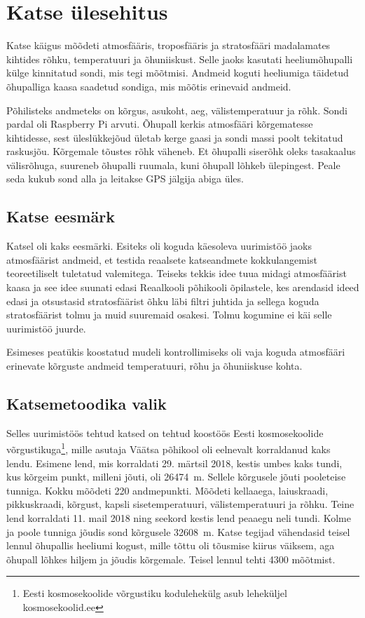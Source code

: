 \documentclass{trkut}%
\begin{document}
\chapter{Katse ülesehitus}
Katse käigus mõõdeti atmosfääris, troposfääris ja stratosfääri madalamates kihtides rõhku, temperatuuri ja õhuniiskust. Selle jaoks kasutati heeliumõhupalli külge kinnitatud sondi, mis tegi mõõtmisi. Andmeid koguti heeliumiga täidetud õhupalliga kaasa saadetud sondiga, mis mõõtis erinevaid andmeid.

Põhilisteks andmeteks on kõrgus, asukoht, aeg, välistemperatuur ja rõhk. Sondi pardal oli Raspberry Pi arvuti. Õhupall kerkis atmosfääri kõrgematesse kihtidesse, sest üleslükkejõud ületab kerge gaasi ja sondi massi poolt tekitatud raskusjõu. Kõrgemale tõustes rõhk väheneb. Et õhupalli siserõhk oleks tasakaalus välisrõhuga, suureneb õhupalli ruumala, kuni õhupall lõhkeb ülepingest. Peale seda kukub sond alla ja leitakse GPS jälgija abiga üles.


\section{Katse eesmärk}
Katsel oli kaks eesmärki. Esiteks oli koguda käesoleva uurimistöö jaoks atmosfäärist andmeid, et testida reaalsete katseandmete kokkulangemist teoreetiliselt tuletatud valemitega. Teiseks tekkis idee tuua midagi atmosfäärist kaasa ja see idee suunati edasi Reaalkooli põhikooli õpilastele, kes arendasid ideed edasi ja otsustasid stratosfäärist õhku läbi filtri juhtida ja sellega koguda stratosfäärist tolmu ja muid suuremaid osakesi. Tolmu kogumine ei käi selle uurimistöö juurde.

Esimeses peatükis koostatud mudeli kontrollimiseks oli vaja koguda atmosfääri erinevate kõrguste andmeid temperatuuri, rõhu ja õhuniiskuse kohta.

\section{Katsemetoodika valik}
Selles uurimistöös tehtud katsed on tehtud koostöös Eesti kosmosekoolide võrgustikuga\footnote{Eesti kosmosekoolide võrgustiku kodulehekülg asub leheküljel kosmosekoolid.ee}, mille asutaja Väätsa põhikool oli eelnevalt korraldanud kaks lendu. Esimene lend, mis korraldati 29. märtsil 2018, kestis umbes kaks tundi, kus kõrgeim punkt, milleni jõuti, oli \SI{26474}{m}. Sellele kõrgusele jõuti pooleteise tunniga. Kokku mõõdeti 220 andmepunkti. Mõõdeti kellaaega, laiuskraadi, pikkuskraadi, kõrgust, kapsli sisetemperatuuri, välistemperatuuri ja rõhku. Teine lend korraldati 11. mail 2018 ning seekord kestis lend peaaegu neli tundi. Kolme ja poole tunniga jõudis sond kõrgusele \SI{32608}{m}. Katse tegijad vähendasid teisel lennul õhupallis heeliumi kogust, mille tõttu oli tõusmise kiirus väiksem, aga õhupall lõhkes hiljem ja jõudis kõrgemale. Teisel lennul tehti 4300 mõõtmist.
\end{document}
